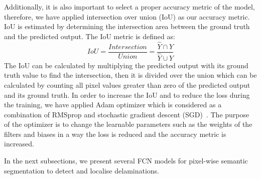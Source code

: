 Additionally, it is also important to select a proper accuracy metric of the model, therefore, we have applied intersection over union (IoU) as our accuracy metric. 
IoU is estimated by determining the intersection area between the ground truth and the predicted output.  
The IoU metric is defined as:
\begin{equation}
IoU = \frac{Intersection}{Union} = \frac{\hat{Y} \cap Y}{\hat{Y} \cup Y} 
\label{IoU}
\end{equation}
The IoU can be calculated by multiplying the predicted output with its ground truth value to find the intersection, then it is divided over the union which can be calculated by counting all pixel values greater than zero of the predicted output and its ground truth.
In order to increase the IoU and to reduce the loss during the training, we have applied Adam optimizer which is considered as a combination of RMSprop and stochastic gradient descent (SGD)~\cite{Kingma2015}. 
The purpose of the optimizer is to change the learnable parameters such as the weights of the filters and biases in a way the loss is reduced and the accuracy metric is increased.

In the next subsections, we present several FCN models for pixel-wise semantic segmentation to detect and localise delaminations.
